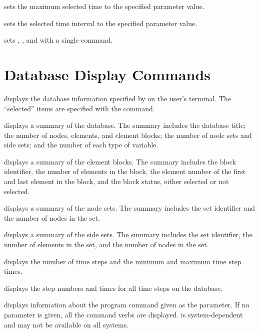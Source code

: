  {
 sets the maximum selected time  to the specified
parameter value. 
}

 {
 sets the selected time interval  to the
specified parameter value.
}

 {
 sets , , and 
 with a single command.
}

\section{Database Display Commands}
\label{cmd:display}

 {
 displays the database information specified by 
on the user's terminal. The ``selected'' items are specified with the
 command.

 {
displays a summary of the database. The summary includes the database
title; the number of nodes, elements, and element blocks; the number of
node sets and side sets; and the number of each type of
variable.
}

 {
displays a summary of the element blocks. The summary includes
the block identifier, the number of elements in the block, the element
number of the first and last element in the block, and the block status,
either selected or not selected.
}

 {
displays a summary of the node sets. The summary
includes the set identifier and the number of nodes in the set.
}

 {
displays a summary of the side sets. The summary
includes the set identifier, the number of elements in the set, and the
number of nodes in the set.
}

 {
displays the number of time steps and the minimum and maximum time step
times.
}

 {
displays the step numbers and times for all time steps on the database.
}
}

 {
 displays information about the program command given as the
parameter. If no parameter is given, all the command verbs are
displayed.  is system-dependent and may not be available on
all systems.
}

